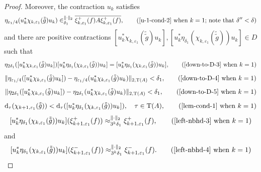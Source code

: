 \documentclass[12pt, oneside, psamsfonts]{amsart}
\theoremstyle{definition}
\theoremstyle{remark}
\numberwithin{equation}{section}
\newcommand{\norm}[1]{\| #1\|}
\newcommand{\eps}{\varepsilon}
\newcommand{\tr}{\mathrm{T}}
\begin{document}
\begin{proof}
Moreover, the contraction $u_k$ satisfies  
\begin{equation}\label{k-u-1-cond-2}
\eta_{\eps_1/4}(u^*_k \chi_{k, \eps_1}(\tilde{\tilde{g}}) u_k) \in^{\norm{\cdot}_2}_{\delta_1} \overline{\xi_{k, \eps_1}^+(f) A \xi_{k, \eps_1}^+(f)}, \quad \quad \textrm{(\eqref{u-1-cond-2} when $k=1$; note that $\delta''<\delta$)}
\end{equation}
and there are positive contractions $[u^*_k\chi_{k, \eps_1}(\tilde{\tilde{g}}) u_k], [u^*_k\eta_{\delta_1}(\chi_{k, \eps_1}(\tilde{\tilde{g}})) u_k] \in D$ such that
\begin{equation}\label{k-down-to-D-3}
 \eta_{2\delta_1}([u^*_k\chi_{k, \eps_1}(\tilde{\tilde{g}}) u_k]) [u^*_k\eta_{\delta_1}(\chi_{k, \eps_1}(\tilde{\tilde{g}})) u_k]  = [u^*_k\eta_{\delta_1}(\chi_{k, \eps_1}(\tilde{\tilde{g}})) u_k], \quad \quad \textrm{(\eqref{down-to-D-3} when $k=1$)}
 \end{equation}
 \begin{equation}\label{k-down-to-D-4} 
 \norm{ \eta_{\eps_1/4}([u_k^*\chi_{k, \eps_1}(\tilde{\tilde{g}})u_k]) - \eta_{\eps_1/4}(u_k^*\chi_{k, \eps_1}(\tilde{\tilde{g}})u_k) }_{2, \tr(A)} < \delta_1, \quad \quad \textrm{(\eqref{down-to-D-4} when $k=1$)}
 \end{equation}
 \begin{equation}\label{k-down-to-D-5} 
 \norm{ \eta_{2\delta_1}([u_k^*\chi_{k, \eps_1}(\tilde{\tilde{g}})u_k]) - \eta_{2\delta_1}(u_k^*\chi_{k, \eps_1}(\tilde{\tilde{g}})u_k) }_{2, \tr(A)} < \delta_1, \quad \quad \textrm{(\eqref{down-to-D-5} when $k=1$)}
 \end{equation}
\begin{equation}\label{k-lem-cond-1}
\mathrm{d}_\tau(\chi_{k+1, \eps_1}(\tilde{\tilde{g}})) < \mathrm{d}_\tau([u^*_k\eta_{\delta_1}(\chi_{k, \eps_1}(\tilde{\tilde{g}}))u_k]), \quad \tau \in\tr(A), \quad \quad \textrm{(\eqref{lem-cond-1} when $k=1$)}
\end{equation}
\begin{equation}\label{k-left-nbhd-3}
  [u^*_k\eta_{\delta_1}(\chi_{k, \eps_1}(\tilde{\tilde{g}}))u_k] (\xi^+_{k+1, \eps_1}(f)) \approx^{\norm{\cdot}_2}_{3^k\delta_1} \xi^+_{k+1, \eps_1}(f), \quad \quad \textrm{(\eqref{left-nbhd-3} when $k=1$)} 
\end{equation} 
and
\begin{equation}\label{k-left-nbhd-4}
  [u^*_k\eta_{\delta_1}(\chi_{k, \eps_1}(\tilde{\tilde{g}}))u_k] (\xi^-_{k+1, \eps_1}(f)) \approx^{\norm{\cdot}_2}_{3^k\delta_1} \xi^-_{k+1, \eps_1}(f). \quad \quad \textrm{(\eqref{left-nbhd-4} when $k=1$)}
\end{equation} 


\end{proof}
\end{document}
